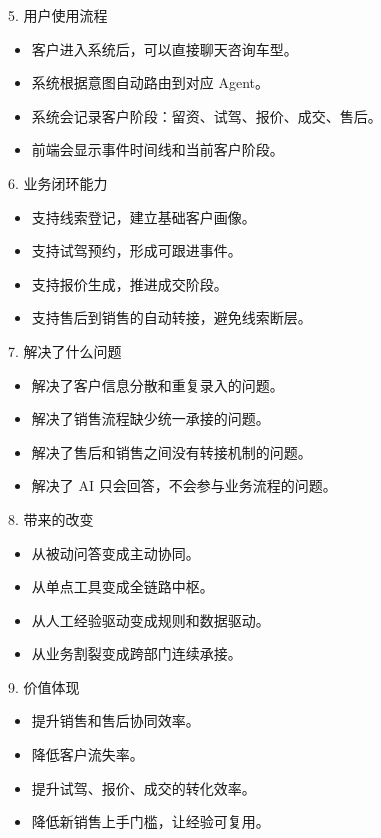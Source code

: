\documentclass[aspectratio=169,12pt]{beamer}
\begin{document}
\begin{frame}{5. 用户使用流程}
\begin{itemize}
  \item 客户进入系统后，可以直接聊天咨询车型。
  \item 系统根据意图自动路由到对应 Agent。
  \item 系统会记录客户阶段：留资、试驾、报价、成交、售后。
  \item 前端会显示事件时间线和当前客户阶段。
\end{itemize}
\end{frame}

\begin{frame}{6. 业务闭环能力}
\begin{itemize}
  \item 支持线索登记，建立基础客户画像。
  \item 支持试驾预约，形成可跟进事件。
  \item 支持报价生成，推进成交阶段。
  \item 支持售后到销售的自动转接，避免线索断层。
\end{itemize}
\end{frame}

\begin{frame}{7. 解决了什么问题}
\begin{itemize}
  \item 解决了客户信息分散和重复录入的问题。
  \item 解决了销售流程缺少统一承接的问题。
  \item 解决了售后和销售之间没有转接机制的问题。
  \item 解决了 AI 只会回答，不会参与业务流程的问题。
\end{itemize}
\end{frame}

\begin{frame}{8. 带来的改变}
\begin{itemize}
  \item 从被动问答变成主动协同。
  \item 从单点工具变成全链路中枢。
  \item 从人工经验驱动变成规则和数据驱动。
  \item 从业务割裂变成跨部门连续承接。
\end{itemize}
\end{frame}

\begin{frame}{9. 价值体现}
\begin{itemize}
  \item 提升销售和售后协同效率。
  \item 降低客户流失率。
  \item 提升试驾、报价、成交的转化效率。
  \item 降低新销售上手门槛，让经验可复用。
\end{itemize}
\end{frame}
\end{document}

